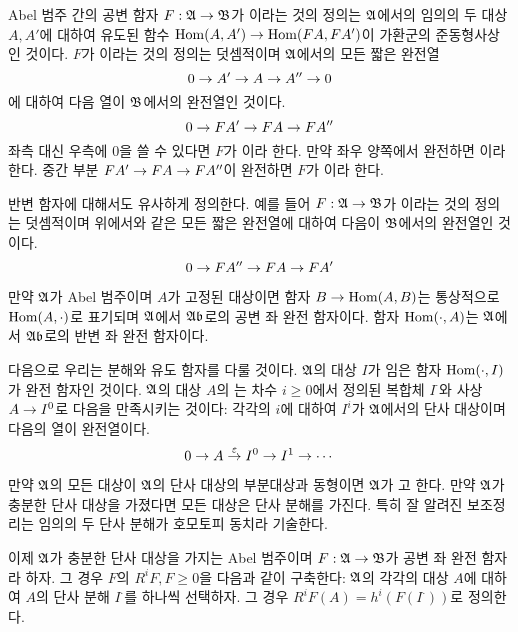 	Abel 범주 간의 공변 함자 $F:\mathfrak{A}\rightarrow\mathfrak{B}$가 이라는 것의 정의는
	$\mathfrak{A}$에서의 임의의 두 대상 $A,A'$에 대하여 유도된 함수 $\operatorname{Hom}(A,A')\rightarrow\operatorname{Hom}(FA,FA')$이 가환군의 준동형사상인 것이다.
	$F$가 이라는 것의 정의는 덧셈적이며 $\mathfrak{A}$에서의 모든 짧은 완전열
	$$0\rightarrow A'\rightarrow A\rightarrow A''\rightarrow 0$$
	에 대하여 다음 열이 $\mathfrak{B}$에서의 완전열인 것이다.
	$$0\rightarrow FA'\rightarrow FA\rightarrow FA''$$
	좌측 대신 우측에 0을 쓸 수 있다면 $F$가 이라 한다. 만약 좌우 양쪽에서 완전하면 이라 한다.
	중간 부분 $FA'\rightarrow FA\rightarrow FA''$이 완전하면 $F$가 이라 한다.
	
	반변 함자에 대해서도 유사하게 정의한다. 예를 들어 $F:\mathfrak{A}\rightarrow\mathfrak{B}$가 이라는 것의 정의는
	덧셈적이며 위에서와 같은 모든 짧은 완전열에 대하여 다음이 $\mathfrak{B}$에서의 완전열인 것이다.
	$$0\rightarrow FA''\rightarrow FA\rightarrow FA'$$
	
	
	\begin{example}
	만약 $\mathfrak{A}$가 Abel 범주이며 $A$가 고정된 대상이면 함자 $B\rightarrow\operatorname{Hom}(A,B)$는
	통상적으로 $\operatorname{Hom}(A,\cdot)$로 표기되며 $\mathfrak{A}$에서 $\mathfrak{Ab}$로의 공변 좌 완전 함자이다.
	함자 $\operatorname{Hom}(\cdot,A)$는 $\mathfrak{A}$에서 $\mathfrak{Ab}$로의 반변 좌 완전 함자이다.
	\end{example}
	
	다음으로 우리는 분해와 유도 함자를 다룰 것이다. $\mathfrak{A}$의 대상 $I$가 임은 함자 $\operatorname{Hom}(\cdot,I)$가 완전 함자인 것이다.
	$\mathfrak{A}$의 대상 $A$의 는
	차수 $i\ge 0$에서 정의된 복합체 $I^\cdot$와 사상 $A\rightarrow I^0$로 다음을 만족시키는 것이다:
	각각의 $i$에 대하여 $I^i$가 $\mathfrak{A}$에서의 단사 대상이며 다음의 열이 완전열이다.
	$$0\rightarrow A\stackrel{\varepsilon}{\rightarrow} I^0\rightarrow I^1\rightarrow\cdots$$
	
	만약 $\mathfrak{A}$의 모든 대상이 $\mathfrak{A}$의 단사 대상의 부분대상과 동형이면
	$\mathfrak{A}$가 고 한다.
	만약 $\mathfrak{A}$가 충분한 단사 대상을 가졌다면 모든 대상은 단사 분해를 가진다.
	특히 잘 알려진 보조정리는 임의의 두 단사 분해가 호모토피 동치라 기술한다.
	
	이제 $\mathfrak{A}$가 충분한 단사 대상을 가지는 Abel 범주이며 $F:\mathfrak{A}\rightarrow\mathfrak{B}$가 공변 좌 완전 함자라 하자.
	그 경우 $F$의  $R^iF,F\ge 0$을 다음과 같이 구축한다:
	$\mathfrak{A}$의 각각의 대상 $A$에 대하여 $A$의 단사 분해 $I^\cdot$를 하나씩 선택하자.
	그 경우 $R^iF(A)=h^i(F(I^\cdot))$로 정의한다.
	
	
	
	
	
	
	
	
	
	
	
	
	
	
	
	
	
	
	
	
	
	
	
	
	
	
	
	